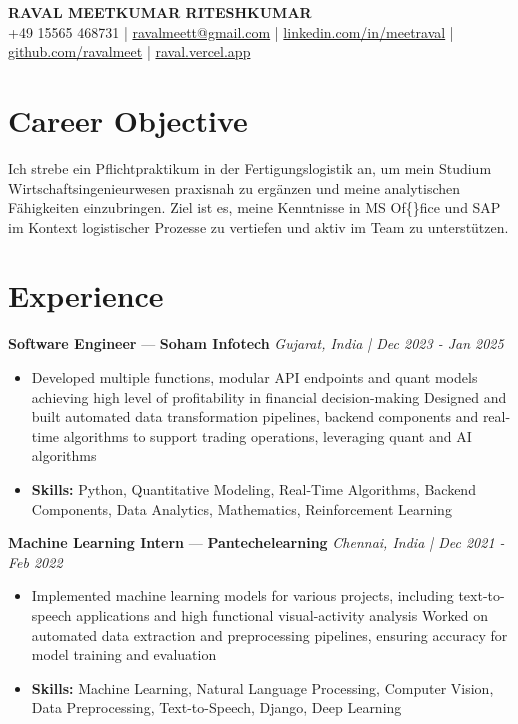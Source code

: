 \documentclass[a4paper,10pt]{article}
\begin{document}
\begin{center}
  {\Large\bfseries RAVAL MEETKUMAR RITESHKUMAR}\\[2pt]
  {\small +49 15565 468731 \;|\; \href{mailto:ravalmeett@gmail.com}{ravalmeett@gmail.com} \;|\; \href{https://www.linkedin.com/in/meetraval/}{linkedin.com/in/meetraval} \;|\; \href{https://github.com/ravalmeet}{github.com/ravalmeet} \;|\; \href{https://raval.vercel.app/}{raval.vercel.app}}
\end{center}
\vspace{-3pt}

\section*{Career Objective}
Ich strebe ein Pflichtpraktikum in der Fertigungslogistik an, um mein Studium Wirtschaftsingenieurwesen praxisnah zu ergänzen und meine analytischen Fähigkeiten einzubringen. Ziel ist es, meine Kenntnisse in MS Of\{\}fice und SAP im Kontext logistischer Prozesse zu vertiefen und aktiv im Team zu unterstützen.\par

\section*{Experience}
\textbf{Software Engineer} — \textbf{Soham Infotech} \hfill \textit{Gujarat, India \;|\; Dec 2023 - Jan 2025}\par
\vspace{1pt}
\begin{itemize}
  \item Developed multiple functions, modular API endpoints and quant models achieving high level of profitability in financial decision-making Designed and built automated data transformation pipelines, backend components and real-time algorithms to support trading operations, leveraging quant and AI algorithms
  \item \textbf{Skills:} Python, Quantitative Modeling, Real-Time Algorithms, Backend Components, Data Analytics, Mathematics, Reinforcement Learning
\end{itemize}
\vspace{3pt}
\textbf{Machine Learning Intern} — \textbf{Pantechelearning} \hfill \textit{Chennai, India \;|\; Dec 2021 - Feb 2022}\par
\vspace{1pt}
\begin{itemize}
  \item Implemented machine learning models for various projects, including text-to-speech applications and high functional visual-activity analysis Worked on automated data extraction and preprocessing pipelines, ensuring accuracy for model training and evaluation
  \item \textbf{Skills:} Machine Learning, Natural Language Processing, Computer Vision, Data Preprocessing, Text-to-Speech, Django, Deep Learning
\end{itemize}
\end{document}
